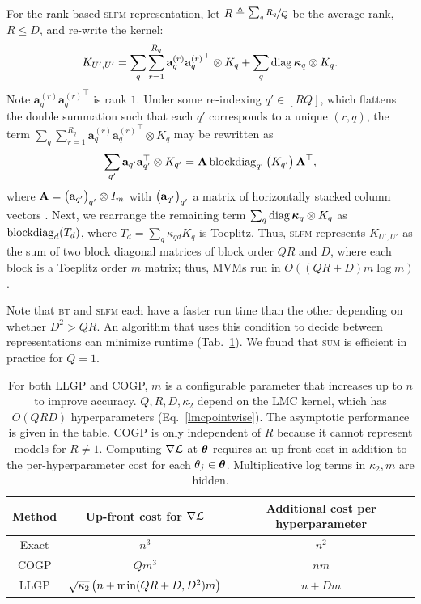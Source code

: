 \documentclass{article}
\begin{document}
For the rank-based \textsc{slfm} representation, let $R\triangleq \nicefrac{\sum_qR_q}{Q}$ be the average rank, $R\le D$, and re-write the kernel:
\begin{align*}
  K_{{U'},{U'}}=\sum_q\sum_{r=1}^{R_q}\textbf{a}_q^{(r)}{\textbf{a}_q^{(r)}}^\top\otimes K_q + \sum_q\operatorname{diag}{\boldsymbol\kappa}_q \otimes K_q.
\end{align*}
Note $\textbf{a}_q^{(r)}{\textbf{a}_q^{(r)}}^\top$ is rank $1$. Under some re-indexing $q'\in[RQ]$, which flattens the double summation such that each $q'$ corresponds to a unique $(r, q)$, the term $\sum_q\sum_{r=1}^{R_q}\textbf{a}_q^{(r)}{\textbf{a}_q^{(r)}}^\top\otimes K_q $ may be rewritten as
\begin{align*}
  \sum_{q'}\textbf{a}_{q'}\textbf{a}_{q'}^\top\otimes K_{q'} = \textbf{A}\operatorname{blockdiag}_{q'}\begin{pmatrix} K_{q'} \end{pmatrix}\textbf{A}^\top,
\end{align*}
where $\textbf{A}=\begin{pmatrix}  \textbf{a}_{q'} \end{pmatrix}_{q'}\otimes I_m$ with $\begin{pmatrix}  \textbf{a}_{q'} \end{pmatrix}_{q'}$ a matrix of horizontally stacked column vectors \cite{seeger2005semiparametric}. Next, we rearrange the remaining term $\sum_q\operatorname{diag}{\boldsymbol\kappa}_q \otimes K_q$ as $\operatorname{blockdiag}_d(T_d)$, where $T_d=\sum_q \kappa_{qd}K_q$ is Toeplitz. Thus, \textsc{slfm} represents $K_{{U'},{U'}}$ as the sum of two block diagonal matrices of block order $QR$ and $D$, where each block is a Toeplitz order $m$ matrix; thus, MVMs run in $O((QR + D)m\log m)$.

Note that \textsc{bt} and \textsc{slfm} each have a faster run time than the other depending on whether $D^2>QR$. An algorithm that uses this condition to decide between representations can minimize runtime (Tab.~\ref{asymp}). We found that \textsc{sum} is efficient in practice for $Q=1$.

\begin{table}[!h]
  \caption{
   For both LLGP and COGP, $m$ is a configurable parameter that increases up to $n$ to improve accuracy. $Q,R,D,\kappa_2$ depend on the LMC kernel, which has $O(QRD)$ hyperparameters (Eq.~\ref{lmcpointwise}). The asymptotic performance is given in the table. COGP is only independent of $R$ because it cannot represent models for $R\neq 1$. Computing $\nabla\mathcal{L}$ at ${\boldsymbol\theta}$ requires an up-front cost in addition to the per-hyperparameter cost for each $\theta_j\in{\boldsymbol\theta}$. Multiplicative log terms in $\kappa_2, m$ are hidden.
  }
\label{asymp}
\begin{sc}
\begin{center}
\begin{small}
\begin{tabular}{ccc}
  \toprule
  Method & Up-front cost for $\nabla \mathcal{L}$ & Additional cost per hyperparameter\\
  \midrule
  Exact & $n^3$ & $n^2 $\\
  COGP & $Qm^3$ & $nm$ \\
  LLGP & $\sqrt{\kappa_2} \left({n +\min(QR+D, D^2) m}\right)$ &  $n + D m$ \\
  \bottomrule
\end{tabular}
\end{small}
\end{center}
\end{sc}
\end{table}
\end{document}
